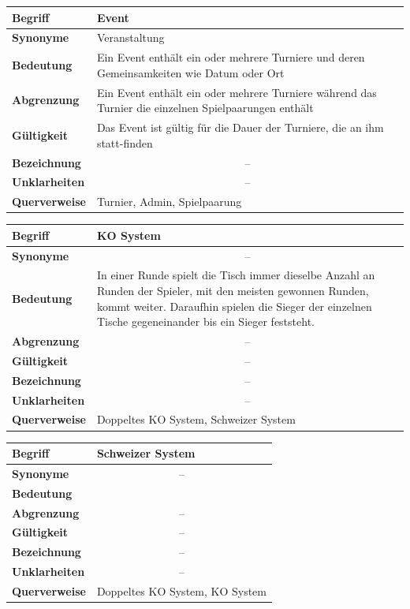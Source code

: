 \documentclass[11pt]{article}
\begin{document}
\begin{tabularx}{\textwidth}{| p{} | p{} |}
	\hline
	\textbf{Begriff} & Event\\
	\hline
	\textbf{Synonyme} & Veranstaltung \\
	\hline
	\textbf{Bedeutung} & Ein Event enthält ein oder mehrere Turniere und deren Gemeinsamkeiten wie Datum oder Ort\\
	\hline
	\textbf{Abgrenzung} & Ein Event enthält ein oder mehrere Turniere während das Turnier die einzelnen Spielpaarungen enthält\\
	\hline
	\textbf{Gültigkeit} & Das Event ist gültig für die Dauer der Turniere, die an ihm statt-finden\\
	\hline
	\textbf{Bezeichnung} & \multicolumn{1}{c|}{--} \\
	\hline
	\textbf{Unklarheiten} & \multicolumn{1}{c|}{--} \\
	\hline
	\textbf{Querverweise} & Turnier, Admin, Spielpaarung\\
	\hline
\end{tabularx}

\begin{tabularx}{\textwidth}{| p{} | p{} |}
	\hline
	\textbf{Begriff} & KO System\\ 
	\hline
	\textbf{Synonyme} & \multicolumn{1}{c|}{--}\\
	\hline 
	\textbf{Bedeutung} & In einer Runde spielt die Tisch immer dieselbe Anzahl an Runden der Spieler, mit den meisten gewonnen Runden, kommt weiter. Daraufhin spielen die Sieger der einzelnen Tische gegeneinander bis ein Sieger feststeht.\\
	\hline
	\textbf{Abgrenzung} & \multicolumn{1}{c|}{--}\\
	\hline
	\textbf{Gültigkeit} & \multicolumn{1}{c|}{--}\\
	\hline
	\textbf{Bezeichnung} & \multicolumn{1}{c|}{--}\\
	\hline
	\textbf{Unklarheiten} & \multicolumn{1}{c|}{--} \\
	\hline
	\textbf{Querverweise} & Doppeltes KO System, Schweizer System\\
	\hline
\end{tabularx}

\newpage

\begin{tabularx}{\textwidth}{| p{} | p{} |}
	\hline
	\textbf{Begriff} & Schweizer System\\ 
	\hline
	\textbf{Synonyme} & \multicolumn{1}{c|}{--}\\
	\hline 
	\textbf{Bedeutung} & \\
	\hline
	\textbf{Abgrenzung} & \multicolumn{1}{c|}{--}\\
	\hline
	\textbf{Gültigkeit} & \multicolumn{1}{c|}{--}\\
	\hline
	\textbf{Bezeichnung} & \multicolumn{1}{c|}{--}\\
	\hline
	\textbf{Unklarheiten} & \multicolumn{1}{c|}{--} \\
	\hline
	\textbf{Querverweise} & Doppeltes KO System, KO System\\
	\hline
\end{tabularx}
\end{document}
